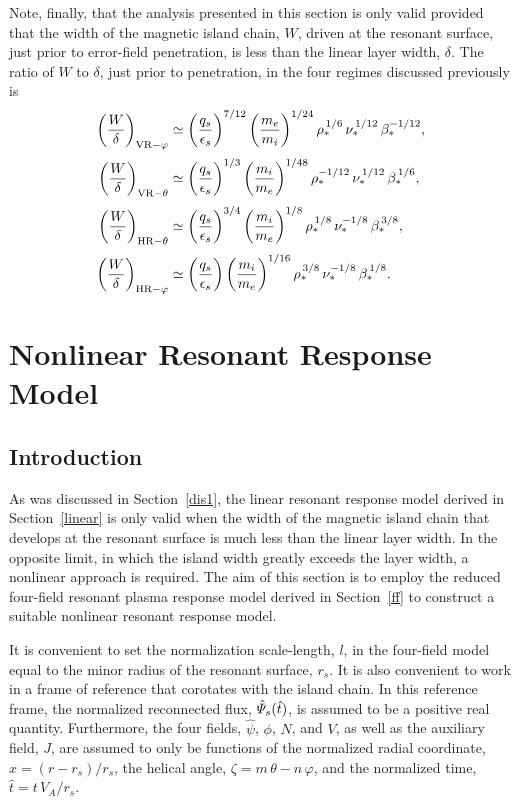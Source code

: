 \documentclass[notitlepage,12pt]{article}
\begin{document}
Note, finally, that the analysis presented in this section is only valid provided that the width of the  magnetic
island chain, $W$,  driven at the resonant surface, just prior to error-field penetration, is less than the linear layer width, $\delta$. 
The ratio of $W$ to $\delta$, just prior to penetration, in the four regimes discussed previously is
\begin{align}
\left(\frac{W}{\delta}\right)_{{\rm VR}-\varphi} &\simeq \left(\frac{q_s}{\epsilon_s}\right)^{7/12}\left(\frac{m_e}{m_i}\right)^{1/24}\rho_\ast^{\,1/6}\,\nu_\ast^{\,1/12}\,\beta_\ast^{-1/12},\\[0.5ex]
\left(\frac{W}{\delta}\right)_{{\rm VR}-\theta} &\simeq \left(\frac{q_s}{\epsilon_s}\right)^{1/3}\left(\frac{m_i}{m_e}\right)^{1/48}\rho_\ast^{-1/12}\,\nu_\ast^{\,1/12}\,\beta_\ast^{\,1/6},\\[0.5ex]
\left(\frac{W}{\delta}\right)_{{\rm HR}-\theta} &\simeq \left(\frac{q_s}{\epsilon_s}\right)^{3/4}\left(\frac{m_i}{m_e}\right)^{1/8}\rho_\ast^{\,1/8}\,\nu_\ast^{-1/8}\,\beta_\ast^{\,3/8},\\[0.5ex]
\left(\frac{W}{\delta}\right)_{{\rm HR}-\varphi} &\simeq \left(\frac{q_s}{\epsilon_s}\right)\left(\frac{m_i}{m_e}\right)^{1/16}\rho_\ast^{\,3/8}\,\nu_\ast^{-1/8}\,\beta_\ast^{\,1/8}.
\end{align}

\section{Nonlinear Resonant Response Model}
\subsection{Introduction}
As was discussed in Section~\ref{dis1}, the linear resonant response model derived in Section~\ref{linear} is only
valid when the width of the magnetic island chain that develops at the resonant surface is much less than the linear layer width. 
In the opposite limit, in which the island width greatly exceeds the layer width, a nonlinear approach is required. 
The aim of this section  is to employ the reduced four-field resonant plasma response model derived in Section~\ref{ff} to 
construct a suitable nonlinear resonant response model. 

It is convenient to set the normalization scale-length, $l$, in the four-field  model equal to the minor radius of the resonant surface, $r_s$. It is also convenient to work in a frame of reference that corotates with the island chain. In this reference frame, the
normalized reconnected flux, $\hat{\mit\Psi}_s(\hat{t})$, is assumed to be a positive real quantity. 
Furthermore, the four fields,
$\hat{\psi}$, $\phi$, $N$, and $V$, as well as the auxiliary field, $J$, are assumed to only be functions of  the normalized radial coordinate, $\hat{x} = (r-r_s)/r_s$, the
helical angle, $\zeta= m\,\theta-n\,\varphi$, and the
normalized time, $\hat{t}= t\,V_A/r_s$. 
\end{document}
